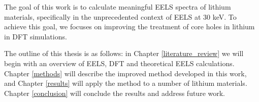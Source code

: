 The goal of this work is to calculate meaningful EELS spectra of lithium materials, specifically in the unprecedented context of EELS at 30 keV. To achieve this goal, we focuses on improving the treatment of core holes in lithium in DFT simulations. 

The outline of this thesis is as follows: in Chapter \ref{literature_review} we will begin with an overview of EELS, DFT and theoretical EELS calculations.  Chapter \ref{methods} will describe the improved method developed in this work, and Chapter \ref{results} will apply the method to a number of lithium materials.  Chapter \ref{conclusion} will conclude the results and address future work.


